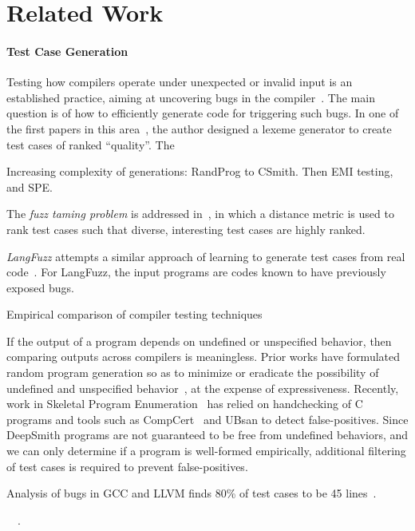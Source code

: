 \section{Related Work}\label{sec:rw}

\paragraph{Test Case Generation} 
Testing how compilers operate under unexpected or invalid input is an established practice, aiming at uncovering bugs in the compiler~\cite{Boujarwah1997}. The main question is of how to efficiently generate code for triggering such bugs. In one of the first papers in this area~\cite{McKeeman1998}, the author designed a lexeme generator to create test cases of ranked ``quality''. The 

Increasing complexity of generations: RandProg to CSmith. Then EMI testing, and SPE.

The \emph{fuzz taming problem} is addressed in~\cite{Chen2013}, in which a distance metric is used to rank test cases such that diverse, interesting test cases are highly ranked.

\emph{LangFuzz} attempts a similar approach of learning to generate test cases from real code~\cite{Holler2012}. For LangFuzz, the input programs are codes known to have previously exposed bugs.

Empirical comparison of compiler testing techniques~\cite{Chen2014a}

 If the output of a program depends on undefined or unspecified behavior, then comparing outputs across compilers is meaningless. Prior works have formulated random program generation so as to minimize or eradicate the possibility of undefined and unspecified behavior~\cite{Yang2011c,Le2013a,Le2015}, at the expense of expressiveness. Recently, work in Skeletal Program Enumeration~\cite{Zhang2017a} has relied on handchecking of C programs and tools such as CompCert~\cite{Leroy2013} and UBsan to detect false-positives. Since DeepSmith programs are not guaranteed to be free from undefined behaviors, and we can only determine if a program is well-formed empirically, additional filtering of test cases is required to prevent false-positives.

Analysis of bugs in GCC and LLVM finds 80\% of test cases to be 45 lines~\cite{Sun2016}.

~\cite{Godefroid2008a,Le2015,Sun2016a}~\cite{Kossatchev2005}.

